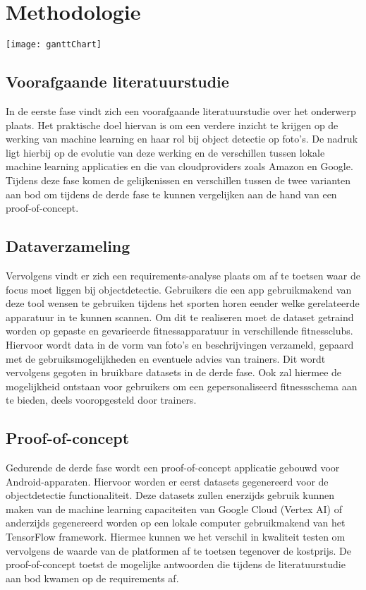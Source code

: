 \section{Methodologie}
\label{sec:methodologie}
\texttt{[image: ganttChart]}

\subsection{Voorafgaande literatuurstudie}
\label{subsec:literature-study}
In de eerste fase vindt zich een voorafgaande literatuurstudie over het onderwerp plaats. %
Het praktische doel hiervan is om een verdere inzicht te krijgen op de werking van machine learning en haar rol bij object detectie op foto's.
De nadruk ligt hierbij op de evolutie van deze werking en de verschillen tussen lokale machine learning applicaties en die van cloudproviders zoals Amazon en Google.
Tijdens deze fase komen de gelijkenissen en verschillen tussen de twee varianten aan bod om tijdens de derde fase te kunnen vergelijken aan de hand van een proof-of-concept.

\subsection{Dataverzameling}
\label{subsec:dataverzameling}
Vervolgens vindt er zich een requirements-analyse plaats om af te toetsen waar de focus moet liggen bij objectdetectie. %
Gebruikers die een app gebruikmakend van deze tool wensen te gebruiken tijdens het sporten horen eender welke gerelateerde apparatuur in te kunnen scannen.
Om dit te realiseren moet de dataset getraind worden op gepaste en gevarieerde fitnessapparatuur in verschillende fitnessclubs.
Hiervoor wordt data in de vorm van foto's en beschrijvingen verzameld, gepaard met de gebruiksmogelijkheden en eventuele advies van trainers.
Dit wordt vervolgens gegoten in bruikbare datasets in de derde fase.
Ook zal hiermee de mogelijkheid ontstaan voor gebruikers om een gepersonaliseerd fitnessschema aan te bieden, deels vooropgesteld door trainers.

\subsection{Proof-of-concept}
\label{subsec:poc}
Gedurende de derde fase wordt een proof-of-concept applicatie gebouwd voor Android-apparaten. %
Hiervoor worden er eerst datasets gegenereerd voor de objectdetectie functionaliteit.
Deze datasets zullen enerzijds gebruik kunnen maken van de machine learning capaciteiten van Google Cloud (Vertex AI) of anderzijds gegenereerd worden op een lokale computer gebruikmakend van het TensorFlow framework.
Hiermee kunnen we het verschil in kwaliteit testen om vervolgens de waarde van de platformen af te toetsen tegenover de kostprijs.
De proof-of-concept toetst de mogelijke antwoorden die tijdens de literatuurstudie aan bod kwamen op de requirements af.

